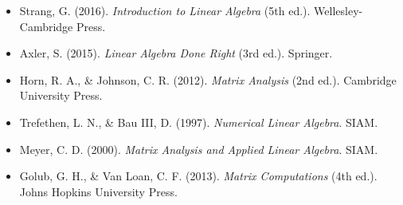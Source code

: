 \documentclass[12pt,a4paper]{article}
\theoremstyle{plain}
\theoremstyle{definition}
\begin{document}
\begin{itemize}
\item Strang, G. (2016). \textit{Introduction to Linear Algebra} (5th ed.). Wellesley-Cambridge Press.
\item Axler, S. (2015). \textit{Linear Algebra Done Right} (3rd ed.). Springer.
\item Horn, R. A., \& Johnson, C. R. (2012). \textit{Matrix Analysis} (2nd ed.). Cambridge University Press.
\item Trefethen, L. N., \& Bau III, D. (1997). \textit{Numerical Linear Algebra}. SIAM.
\item Meyer, C. D. (2000). \textit{Matrix Analysis and Applied Linear Algebra}. SIAM.
\item Golub, G. H., \& Van Loan, C. F. (2013). \textit{Matrix Computations} (4th ed.). Johns Hopkins University Press.
\end{itemize}
\end{document}
